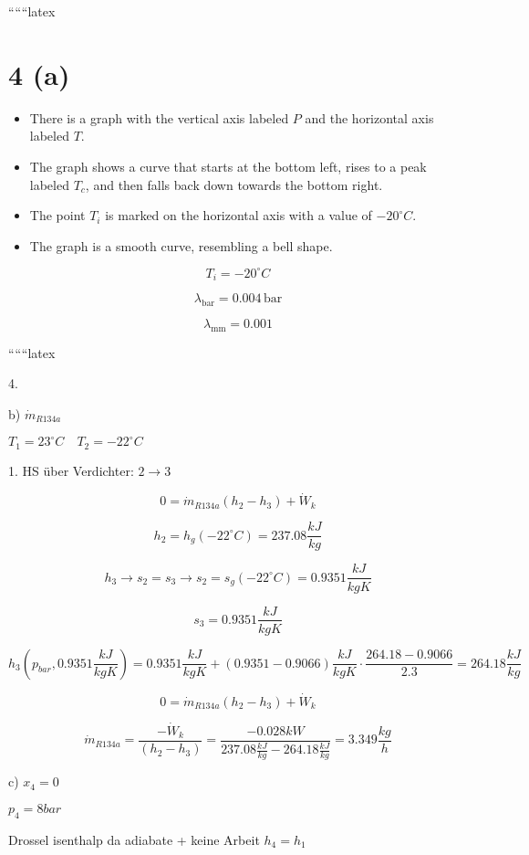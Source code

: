 
``````latex


\section*{4 (a)}

\begin{itemize}
    \item There is a graph with the vertical axis labeled \( P \) and the horizontal axis labeled \( T \).
    \item The graph shows a curve that starts at the bottom left, rises to a peak labeled \( T_c \), and then falls back down towards the bottom right.
    \item The point \( T_i \) is marked on the horizontal axis with a value of \( -20^\circ C \).
    \item The graph is a smooth curve, resembling a bell shape.
\end{itemize}

\[
T_i = -20^\circ C
\]

\[
\lambda_{\text{bar}} = 0.004 \, \text{bar}
\]

\[
\lambda_{\text{mm}} = 0.001
\]

``````latex


4.

b) $\dot{m}_{R134a}$

$T_1 = 23^\circ C \quad T_2 = -22^\circ C$

1. HS über Verdichter: $2 \rightarrow 3$

\[
0 = \dot{m}_{R134a} (h_2 - h_3) + \dot{W}_k
\]

\[
h_2 = h_g (-22^\circ C) = 237.08 \frac{kJ}{kg}
\]

\[
h_3 \rightarrow s_2 = s_3 \rightarrow s_2 = s_g (-22^\circ C) = 0.9351 \frac{kJ}{kgK}
\]

\[
s_3 = 0.9351 \frac{kJ}{kgK}
\]

\[
h_3 (p_{bar}, 0.9351 \frac{kJ}{kgK}) = 0.9351 \frac{kJ}{kgK} + (0.9351 - 0.9066) \frac{kJ}{kgK} \cdot \frac{264.18 - 0.9066}{2.3} = 264.18 \frac{kJ}{kg}
\]

\[
0 = \dot{m}_{R134a} (h_2 - h_3) + \dot{W}_k
\]

\[
\dot{m}_{R134a} = \frac{-\dot{W}_k}{(h_2 - h_3)} = \frac{-0.028 kW}{237.08 \frac{kJ}{kg} - 264.18 \frac{kJ}{kg}} = 3.349 \frac{kg}{h}
\]

c) $x_4 = 0$

$p_4 = 8 bar$

Drossel isenthalp da adiabate + keine Arbeit $h_4 = h_1$

